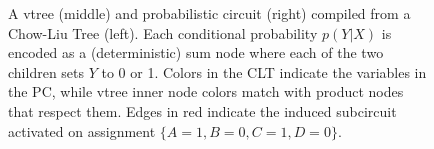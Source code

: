 \begin{figure}[t]
\begin{center}
{
    }
  \end{center}
  \caption{A vtree (middle) and probabilistic circuit (right) compiled from a Chow-Liu Tree (left).
    Each conditional probability $p(Y|X)$ is encoded as a (deterministic) sum node where each of
    the two children sets $Y$ to 0 or 1. Colors in the CLT indicate the variables in the PC, while
    vtree inner node colors match with product nodes that respect them. Edges in red indicate the
    induced subcircuit activated on assignment $\{A=1,B=0,C=1,D=0\}$.}
  \label{fig:strudel}
\end{figure}

